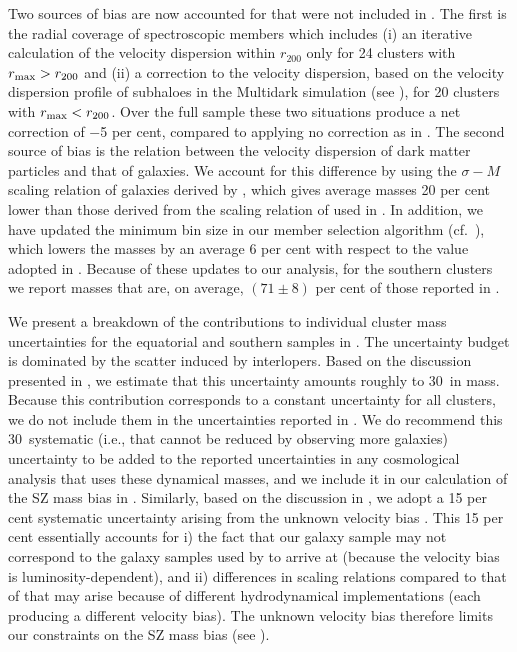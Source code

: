 Two sources of bias are now accounted for that were not included in \cite{sifon13}. The first is 
the radial coverage of spectroscopic members \citep[which was discussed, but not corrected for, 
in][]{sifon13} which includes (i) an iterative calculation of the velocity dispersion within 
$r_{200}$ only for 24 clusters with $r_{\rm max}>r_{200}$ and (ii) a correction to the velocity 
dispersion, based on the velocity dispersion profile of subhaloes in the Multidark simulation (see 
), for 20 clusters with $r_{\rm max}<r_{200}$. Over the full sample these two 
situations produce a net correction of $-$5 per cent, compared to applying no correction as in 
\cite{sifon13}. The second source of bias is the relation between the velocity dispersion of dark 
matter particles and that of galaxies. We account for this difference by using the $\sigma-M$ 
scaling relation of galaxies derived by \cite{munari13}, which gives average masses 20 per cent 
lower than those derived from the scaling relation of \cite{evrard08} used in \cite{sifon13}. In 
addition,  we have updated the minimum bin size in our member selection algorithm (cf.\ 
), which lowers the masses by an average 6 per cent with respect to the value 
adopted in \cite{sifon13}. Because of these updates to our analysis, for the southern clusters we 
report masses that are, on average, $(71\pm8)$ per cent of those reported in \cite{sifon13}. 

We present a breakdown of the contributions to individual cluster mass uncertainties for the equatorial and southern samples in . The uncertainty budget is dominated by the scatter induced by interlopers. Based on the discussion presented in , we estimate that this uncertainty amounts roughly to 30\percent\ in mass. Because this contribution corresponds to a constant uncertainty for all clusters, we do not include them in the uncertainties reported in . We do recommend this 30\percent\ systematic (i.e., that cannot be reduced by observing more galaxies) uncertainty to be added to the reported uncertainties in any cosmological analysis that uses these dynamical masses, and we include it in our calculation of the SZ mass bias in .
%
Similarly, based on the discussion in , we adopt a 15 per cent systematic uncertainty arising from the unknown velocity bias \citep[5\percent\ in velocity; e.g.,][]{wu13}. This 15 per cent essentially accounts for i) the fact that our galaxy sample may not correspond to the galaxy samples used by \cite{munari13} to arrive at  (because the velocity bias is luminosity-dependent), and ii) differences in scaling relations compared to that of \cite{munari13} that may arise because of different hydrodynamical implementations (each producing a different velocity bias). The unknown velocity bias therefore limits our constraints on the SZ mass bias (see ).

